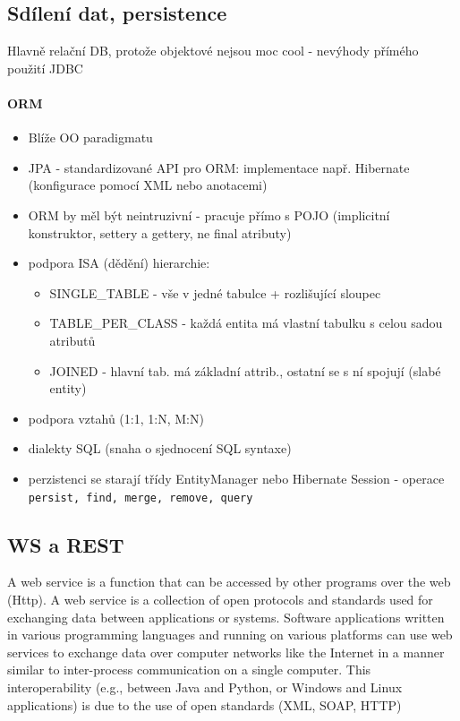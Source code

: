 \subsection{Sdílení dat, persistence}
Hlavně relační DB, protože objektové nejsou moc cool - nevýhody přímého použití JDBC
\paragraph{ORM}
\begin{itemize}[itemsep=0px]
\item Blíže OO paradigmatu
\item JPA - standardizované API pro ORM: implementace např. Hibernate (konfigurace pomocí XML nebo anotacemi)
\item ORM by měl být neintruzivní - pracuje přímo s POJO (implicitní konstruktor, settery a gettery, ne final atributy)
\item podpora ISA (dědění) hierarchie:
    \begin{itemize}[itemsep=0px]
    \item SINGLE\_TABLE - vše v jedné tabulce + rozlišující sloupec
    \item TABLE\_PER\_CLASS - každá entita má vlastní tabulku s celou sadou atributů
    \item JOINED - hlavní tab. má základní attrib., ostatní se s ní spojují (slabé entity)
    \end{itemize}
\item podpora vztahů (1:1, 1:N, M:N)
\item dialekty SQL (snaha o sjednocení SQL syntaxe)
\item perzistenci se starají třídy EntityManager nebo Hibernate Session - operace \texttt{persist, find, merge, remove, query}
\end{itemize}

\subsection{WS a REST}
A web service is a function that can be accessed by other programs over the web (Http). A web service is a collection of open protocols and standards used for exchanging data between applications or systems. Software applications written in various programming languages and running on various platforms can use web services to exchange data over computer networks like the Internet in a manner similar to inter-process communication on a single computer. This interoperability (e.g., between Java and Python, or Windows and Linux applications) is due to the use of open standards (XML, SOAP, HTTP)

